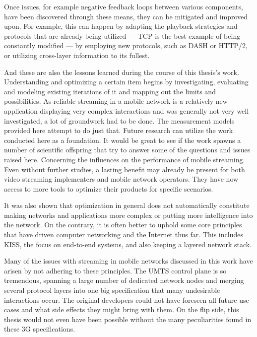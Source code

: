 Once issues, for example negative feedback loops between various components, have been discovered through these means, they can be mitigated and improved upon. For example, this can happen by adapting the playback strategies and protocols that are already being utilized --- \gls{TCP} is the best example of being constantly modified --- by employing new protocols, such as \gls{DASH} or \gls{HTTP}/2, or utilizing cross-layer information to its fullest.

And these are also the lessons learned during the course of this thesis's work. Understanding and optimizing a certain item begins by investigating, evaluating and modeling existing iterations of it and mapping out the limits and possibilities. As reliable streaming in a mobile network is a relatively new application displaying very complex interactions and was generally not very well investigated, a lot of groundwork had to be done. The measurement models provided here attempt to do just that. Future research can utilize the work conducted here as a foundation. It would be great to see if the work spawns a number of scientific offspring that try to answer some of the questions and issues raised here. 
Concerning the influences on the performance of mobile streaming. 
Even without further studies, a lasting benefit may already be present for both video streaming implementers and mobile network operators. They have now access to more tools to optimize their products for specific scenarios.

It was also shown that optimization in general does not automatically constitute making networks and applications more complex or putting more intelligence into the network. On the contrary, it is often better to uphold some core principles that have driven computer networking and the Internet thus far. This includes \gls{KISS}, the focus on end-to-end systems, and also keeping a layered network stack. 

Many of the issues with streaming in mobile networks discussed in this work have arisen by not adhering to these principles. The \gls{UMTS} control plane is so tremendous, spanning a large number of dedicated network nodes and merging several protocol layers into one big specification that many undesirable interactions occur. The original developers could not have foreseen all future use cases and what side effects they might bring with them. On the flip side, this thesis would not even have been possible without the many peculiarities found in these \gls{3G} specifications.


